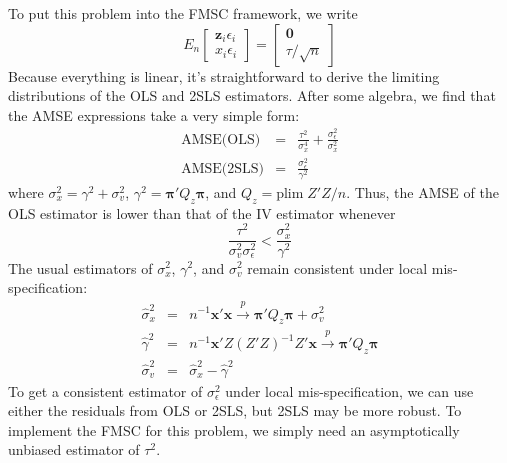 \documentclass[12pt]{article}
\theoremstyle{definition}
\begin{document}
To put this problem into the FMSC framework, we write
	 $$E_n \left[\begin{array}{c} \mathbf{z}_i \epsilon_i \\ x_i \epsilon_i \end{array}\right] = \left[\begin{array}{c} \mathbf{0} \\ \tau/\sqrt{n} \end{array}\right]$$
Because everything is linear, it's straightforward to derive the limiting distributions of the OLS and 2SLS estimators. After some algebra, we find that the AMSE expressions take a very simple form:
  \begin{eqnarray*}
  \mbox{AMSE(OLS)} &=& \frac{\tau^2}{\sigma_x^4} + \frac{\sigma_\epsilon^2}{\sigma_x^2}\\
  \mbox{AMSE(2SLS)} &=& \frac{\sigma_\epsilon^2}{\gamma^2}
  \end{eqnarray*}
where $\sigma_x^2 = \gamma^2 + \sigma_v^2$, $\gamma^2 = \boldsymbol{\pi}'Q_z \boldsymbol{\pi}$, and $Q_z =\mbox{plim} \; Z'Z/n$. Thus, the AMSE of the OLS estimator is lower than that of the IV estimator whenever
$$\frac{\tau^2}{\sigma_v^2 \sigma_\epsilon^2}  < \frac{\sigma_x^2}{\gamma^2} $$
The usual estimators of $\sigma_x^2$, $\gamma^2$, and $\sigma_v^2$ remain consistent under local mis-specification:
  \begin{eqnarray*}
     \widehat{\sigma}_x^2 &=& n^{-1}\mathbf{x}' \mathbf{x} \overset{p}{\rightarrow} \boldsymbol{\pi}'Q_z \boldsymbol{\pi} + \sigma_v^2\\
      \widehat{\gamma}^2 &=& n^{-1}\mathbf{x}' Z (Z'Z)^{-1}Z' \mathbf{x} \overset{p}{\rightarrow} \boldsymbol{\pi}'Q_z \boldsymbol{\pi} \\
      \widehat{\sigma}_v^2 &=& \widehat{\sigma}_x^2 - \widehat{\gamma}^2
  \end{eqnarray*}
To get a consistent estimator of $\sigma_\epsilon^2$ under local mis-specification, we can use either the residuals from OLS or 2SLS, but 2SLS may be more robust. To implement the FMSC for this problem, we simply need an asymptotically unbiased estimator of $\tau^2$. 
\end{document}
